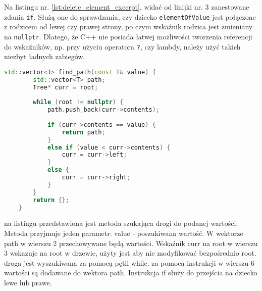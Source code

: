 Na listingu nr. \ref{lst:delete_element_excerpt}, widać od linijki nr. 3 zanestowane zdania \texttt{if}. Służą one do sprawdzania, czy dziecko \texttt{elementOfValue} jest połączone z rodzicem od lewej czy prawej strony, po czym wskaźnik rodzica jest zmieniany na \texttt{nullptr}. Dlatego, że C++ nie posiada łatwej możliwości tworzenia referencji do wskaźników, np. przy użyciu operatora \texttt{?}, czy lambdy, należy użyć takich niezbyt ładnych zabiegów.

\begin{lstlisting}[caption=Metoda \texttt{Filepath}, label={lst:filepath}, language=C++]
	std::vector<T> find_path(const T& value) {
		std::vector<T> path;
		Tree* curr = root;
		
		while (root != nullptr) {
			path.push_back(curr->contents);
			
			if (curr->contents == value) {
				return path;
			}
			else if (value < curr->contents) {
				curr = curr->left;
			}
			else {
				curr = curr->right;
			}
		}
		return {};
	}
\end{lstlisting}
na listingu przedstawiona jest metoda szukająca drogi do podanej wartości. Metoda przyjmuje jeden parametr: value - poszukiwana wartość. W wektorze path w wierszu 2 przechowywane będą wartości. Wskaźnik curr na root w wierszu 3 wskazuje na root w drzewie, użyty jest aby nie modyfikować bezpośrednio root. droga jest wyszukiwana za pomocą pętli while. za pomocą instrukcji w wierszu 6 wartości są dodawane do wektora path. Instrukcja if służy do przejścia na dziecko lewe lub prawe.
